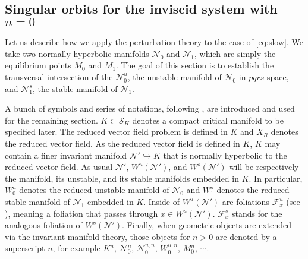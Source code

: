 \documentclass[usletter,11pt]{article}
\theoremstyle{remark}
\begin{document}
\subsection{Singular orbits for the inviscid system with $n=0$}\label{sec:singorb}

Let us describe how we apply the perturbation theory to the case of \eqref{eq:slow}. We take two normally hyperbolic manifolds %
$\mathcal{N}_0$ and $\mathcal{N}_1$, which are simply the equilibrium points $M_0$ and $M_1$. The goal of this section is to establish the transversal intersection of the $\mathcal{N}_0^u$, the unstable manifold of $\mathcal{N}_0$  in $pqrs$-space, and $\mathcal{N}^s_1$, the stable manifold of $\mathcal{N}_1$.  

A bunch of symbols and series of notations, following \cite{Sz1991}, are introduced and used for the remaining section. 
$K\subset\mathcal{S}_H$ denotes a compact critical manifold to be specified later. The reduced vector field problem is defined in $K$ and $X_R$ denotes the reduced vector field. As the reduced vector field is defined in $K$, $K$ may contain a finer invariant manifold $\mathcal{N}' \hookrightarrow K$ that is normally hyperbolic to the reduced vector field. 
As usual $\mathcal{N'}$, $W^u(\mathcal{N}')$, and $W^s(\mathcal{N}')$ will be respectively the manifold, its unstable, and its stable manifolds embedded in $K$. In particular, $W_0^u$ denotes the reduced unstable manifold of $\mathcal{N}_0$ and $W_1^s$ denotes the reduced stable manifold of $\mathcal{N}_1$ embedded in $K$. Inside of $W^u(\mathcal{N}')$ are foliations $\mathcal{F}^u_x$ (see \cite[Theorem 12.2]{fenichel_geometric_1979}), meaning a foliation that passes  through $x\in W^u(\mathcal{N}')$. 
$\mathcal{F}^s_x$ stands for the analogous foliation of  $W^s(\mathcal{N}')$. 
Finally, when geometric objects are extended via the invariant manifold theory,  those objects for $n>0$  are denoted by a superscript $n$, for example $K^n$, $\mathcal{N}_0^n$, $\mathcal{N}_0^{u,n}$, $W_0^{u,n}$, $M_0^n$, $\cdots$. 
\end{document}
